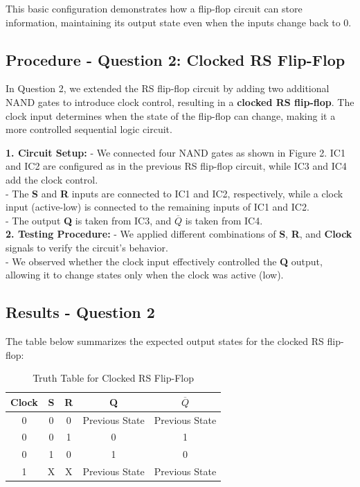 \documentclass{article}
\begin{document}
    This basic configuration demonstrates how a flip-flop circuit can store information, maintaining its output state even when the inputs change back to 0.

    \subsection*{\textbf{Procedure - Question 2: Clocked RS Flip-Flop}}
    In Question 2, we extended the RS flip-flop circuit by adding two additional NAND gates to introduce clock control, resulting in a \textbf{clocked RS flip-flop}. The clock input determines when the state of the flip-flop can change, making it a more controlled sequential logic circuit.

    \textbf{1. Circuit Setup:}
    - We connected four NAND gates as shown in Figure 2. IC1 and IC2 are configured as in the previous RS flip-flop circuit, while IC3 and IC4 add the clock control.
    \\
    - The \textbf{S} and \textbf{R} inputs are connected to IC1 and IC2, respectively, while a clock input (active-low) is connected to the remaining inputs of IC1 and IC2.
    \\
    - The output \textbf{Q} is taken from IC3, and \textbf{\(\overline{Q}\)} is taken from IC4.
    \\

    \textbf{2. Testing Procedure:}
    - We applied different combinations of \textbf{S}, \textbf{R}, and \textbf{Clock} signals to verify the circuit’s behavior.
    \\
    - We observed whether the clock input effectively controlled the \textbf{Q} output, allowing it to change states only when the clock was active (low).
    \\

    \subsection*{\textbf{Results - Question 2}}
    The table below summarizes the expected output states for the clocked RS flip-flop: \\ 

    \begin{table}[H]
        \centering
        \caption{Truth Table for Clocked RS Flip-Flop}
        \begin{tabular}{|c|c|c|c|c|}
            \hline
            Clock & S & R & Q & \(\overline{Q}\) \\
            \hline
            0 & 0 & 0 & Previous State & Previous State \\
            0 & 0 & 1 & 0 & 1 \\
            0 & 1 & 0 & 1 & 0 \\
            1 & X & X & Previous State & Previous State \\
            \hline
        \end{tabular}
    \end{table}
\end{document}
